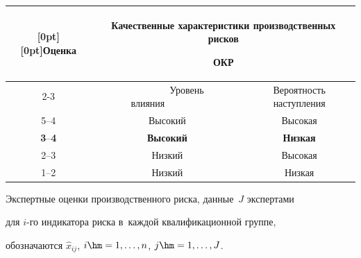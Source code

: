      \begin{table}\small %


     \begin{center}




      \vspace*{2ex}


      


      \begin{tabular}{|c|c|c|} %


      \hline


\raisebox{-6pt}[0pt][0pt]{Оценка}&\multicolumn{2}{c|}{Качественные характеристики производственных рисков 


ОКР}\\


\cline{2-3}


&\ \ \ \ \ \ \ \ Уровень влияния\ \ \ \ \ \ \ \ &Вероятность наступления\\


\hline


5--4&Высокий&Высокая\\


\textbf{3}--\textbf{4}&\textbf{Высокий}&\textbf{Низкая}\\


2--3&Низкий&Высокая\\


1--2&Низкий&Низкая\\


\hline


\end{tabular}


\end{center}


\end{table}


     


     Экспертные оценки производственного риска, данные~$J$ экспертами 


для \mbox{$i$-го} индикатора риска в~каждой квалификационной группе, 


обозначаются $\hat{x}_{ij}$, $i\hm=1,\ldots , n$, $j\hm=1, \ldots , J$.








